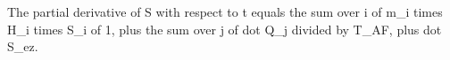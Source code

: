 The partial derivative of S with respect to t equals the sum over i of m_i times H_i times S_i of 1, plus the sum over j of dot Q_j divided by T_AF, plus dot S_ez.